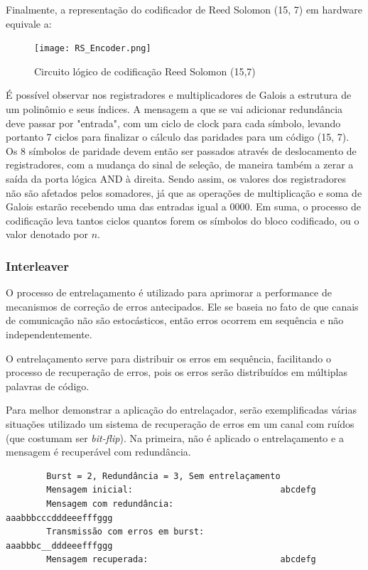 	Finalmente, a representação do codificador de Reed Solomon (15, 7) em hardware equivale a:
	 
	\begin{figure}[!htb]
		\caption{\label{RS_encoder_logic} Circuito lógico de codificação Reed Solomon (15,7)}
		\centering
		\texttt{[image: RS\_Encoder.png]}
	\end{figure}
	
	É possível observar nos registradores e multiplicadores de Galois a estrutura de um polinômio e seus índices. A mensagem a que se vai adicionar redundância deve passar por "entrada", com um ciclo de clock para cada símbolo, levando portanto 7 ciclos para finalizar o cálculo das paridades para um código (15, 7). Os 8 símbolos de paridade devem então ser passados através de deslocamento de registradores, com a mudança do sinal de seleção, de maneira também a zerar a saída da porta lógica AND à direita. Sendo assim, os valores dos registradores não são afetados pelos somadores, já que as operações de multiplicação e soma de Galois estarão recebendo uma das entradas igual a 0000. Em suma, o processo de codificação leva tantos ciclos quantos forem os símbolos do bloco codificado, ou o valor denotado por $n$.
	
	\cite{nasa-rs1}

	\subsubsection{Interleaver}
	
	O processo de entrelaçamento é utilizado para aprimorar a performance de mecanismos de correção de erros antecipados. Ele se baseia no fato de que canais de comunicação não são estocásticos, então erros ocorrem em sequência e não independentemente. 
	
	O entrelaçamento serve para distribuir os erros em sequência, facilitando o processo de recuperação de erros, pois os erros serão distribuídos em múltiplas palavras de código. 
	
	Para melhor demonstrar a aplicação do entrelaçador, serão exemplificadas várias situações utilizado um sistema de recuperação de erros em um canal com ruídos (que costumam ser \textit{bit-flip}). Na primeira, não é aplicado o entrelaçamento e a mensagem é recuperável com redundância.

	\begin{verbatim}
	    Burst = 2, Redundância = 3, Sem entrelaçamento
	    Mensagem inicial:                             abcdefg
	    Mensagem com redundância:                     aaabbbcccdddeeefffggg
	    Transmissão com erros em burst:               aaabbbc__dddeeefffggg
	    Mensagem recuperada:                          abcdefg
	\end{verbatim}

